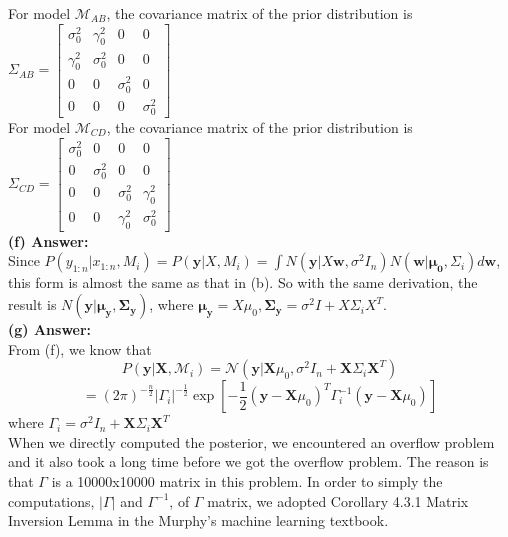 \documentclass{article}
\begin{document}
\noindent
For model $\mathcal{M}_{AB}$, the covariance matrix of the prior distribution is 
$\Sigma_{AB} =
\begin{bmatrix}
 \sigma_0^2 & \gamma_0^2 & 0 & 0\\ 
 \gamma_0^2 & \sigma_0^2 & 0 & 0\\ 
 0 & 0 & \sigma_0^2 & 0\\ 
 0 & 0 & 0 & \sigma_0^2
\end{bmatrix}$\\

\noindent
For model $\mathcal{M}_{CD}$, the covariance matrix of the prior distribution is 
$\Sigma_{CD} =
\begin{bmatrix}
 \sigma_0^2 & 0 & 0 & 0\\ 
 0 & \sigma_0^2 & 0 & 0\\ 
 0 & 0 & \sigma_0^2 & \gamma_0^2\\ 
 0 & 0 & \gamma_0^2 & \sigma_0^2
\end{bmatrix}$\\

\noindent
\textbf{(f) Answer:}\\
Since $P(y_{1:n}|x_{1:n},M_i) = P(\mathbf{y}|X,M_i) = \int N(\mathbf{y}|X \mathbf{w},\sigma^2 I_n) N(\mathbf{w}|\mathbf{\mu_0},\Sigma_i) d \mathbf{w}$, this form is almost the same as that in (b). So with the same derivation, the result is $N(\mathbf{y}|\mathbf{\mu_y, \Sigma_y})$, where $\mathbf{\mu_y} = X\mu_0, \mathbf{\Sigma_y} = \sigma^2 I + X \Sigma_i X^T$.\\

\noindent
\textbf{(g) Answer:}\\
From (f), we know that\\
$$P(\mathbf{y} | \textbf{X}, \mathcal{M}_i) = \mathcal{N}(\mathbf y | \textbf{X}{\mu_0}, \sigma^2I_n + \textbf{X}\Sigma_i\textbf{X}^T)$$
$$=(2\pi)^{-\frac{n}{2}} |\Gamma_i|^{-\frac{1}{2}} \exp[-\frac{1}{2}(\mathbf y - \textbf{X}\mu_0)^T\Gamma_i^{-1}(\mathbf y - \textbf{X}\mu_0)]$$
where $\Gamma_i = \sigma^2I_n + \textbf{X}\Sigma_i\textbf{X}^T$\\

\noindent
When we directly computed the posterior, we encountered an overflow problem and it also took a long time before we got the overflow problem. The reason is that $\Gamma$ is a 10000x10000 matrix in this problem. In order to simply the computations, $|\Gamma|$ and $\Gamma^{-1}$, of $\Gamma$ matrix, we adopted Corollary 4.3.1 Matrix Inversion Lemma in the Murphy's machine learning textbook.\\
\end{document}
